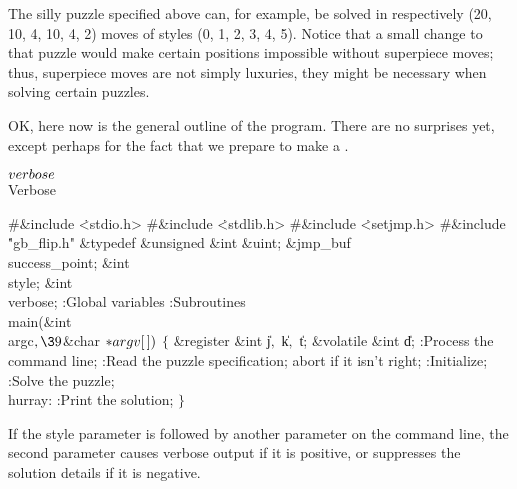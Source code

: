 The silly puzzle specified above can, for example, be solved in
respectively (20, 10, 4, 10, 4, 2) moves of styles (0, 1, 2, 3, 4, 5).
Notice that a small change to that puzzle would make certain positions
impossible without superpiece moves; thus, superpiece moves are not
simply luxuries, they might be necessary when solving certain puzzles.

\fi

OK, here now is the general outline of the program.
There are no surprises yet, except perhaps for the fact that we
prepare to make a .

\Y\B\4\D$\\{verbose}$ \5
\\{Verbose}\par
\Y\B\8\#\&{include} \.{<stdio.h>}\6
\8\#\&{include} \.{<stdlib.h>}\6
\8\#\&{include} \.{<setjmp.h>}\6
\8\#\&{include} \.{"gb\_flip.h"}\6
\&{typedef} \&{unsigned} \&{int} \&{uint};\6
\&{jmp\_buf} \\{success\_point};\6
\&{int} \\{style};\6
\&{int} \\{verbose};\7
:Global variables\X\6
:Subroutines\X\7
\\{main}(\&{int} \\{argc}${},\39{}$\&{char} ${}{*}\\{argv}[\,]){}$\1\1\2\2\6
${}\{{}$\1\6
\&{register} \&{int} \|j${},{}$ \|k${},{}$ \|t;\6
\&{volatile} \&{int} \|d;\7
:Process the command line\X;\6
:Read the puzzle specification; abort if it isn't right\X;\6
:Initialize\X;\6
:Solve the puzzle\X;\6
\4\\{hurray}:\5
:Print the solution\X;\6
\4${}\}{}$\2\par
\fi

If the style parameter is followed by another parameter on the command
line, the second parameter causes verbose output if it is positive,
or suppresses the solution details if it is negative.

